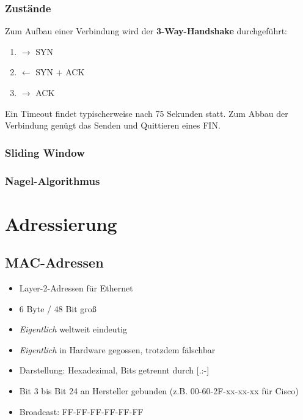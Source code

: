 \documentclass{article} %
\begin{document}
\subsubsection{Zustände}

Zum Aufbau einer Verbindung wird der \textbf{3-Way-Handshake} durchgeführt:
\begin{enumerate}
	\item $\rightarrow$ SYN
	\item $\leftarrow$ SYN + ACK
	\item $\rightarrow$ ACK
\end{enumerate}
Ein Timeout findet typischerweise nach 75 Sekunden statt. Zum Abbau der Verbindung genügt das Senden und Quittieren eines FIN.

\subsubsection{Sliding Window}
\subsubsection{Nagel-Algorithmus}
\section{Adressierung}

\subsection{MAC-Adressen}

\begin{itemize}
	\item Layer-2-Adressen für Ethernet
	\item 6 Byte / 48 Bit groß
	\item \emph{Eigentlich} weltweit eindeutig
	\item \emph{Eigentlich} in Hardware gegossen, trotzdem fälschbar
	\item Darstellung: Hexadezimal, Bits getrennt durch [.:-]
	\item Bit 3 bis Bit 24 an Hersteller gebunden (z.B. 00-60-2F-xx-xx-xx für Cisco)
	\item Broadcast: FF-FF-FF-FF-FF-FF 
\end{itemize}
\end{document}
